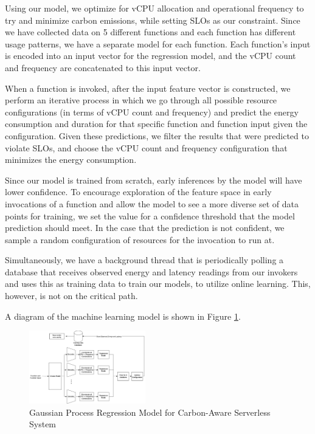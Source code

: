 \documentclass[times, 10pt,twocolumn]{article}
\begin{document}
Using our model, we optimize for vCPU allocation and operational frequency to try and minimize carbon emissions, while setting SLOs as our constraint. Since we have collected data on 5 different functions and each function has different usage patterns, we have a separate model for each function. Each function's input is encoded into an input vector for the regression model, and the vCPU count and frequency are concatenated to this input vector.

When a function is invoked, after the input feature vector is constructed, we perform an iterative process in which we go through all possible resource configurations (in terms of vCPU count and frequency) and predict the energy consumption and duration for that specific function and function input given the configuration. Given these predictions, we filter the results that were predicted to violate SLOs, and choose the vCPU count and frequency configuration that minimizes the energy consumption. 

Since our model is trained from scratch, early inferences by the model will have lower confidence. To encourage exploration of the feature space in early invocations of a function and allow the model to see a more diverse set of data points for training, we set the value for a confidence threshold that the model prediction should meet. In the case that the prediction is not confident, we sample a random configuration of resources for the invocation to run at. 

Simultaneously, we have a background thread that is periodically polling a database that receives observed energy and latency readings from our invokers and uses this as training data to train our models, to utilize online learning. This, however, is not on the critical path.



A diagram of the machine learning model is shown in Figure \ref{fig:ml_model}.

\begin{figure}[ht]
   \centering
   \includegraphics[width=0.45\textwidth]{imgs/ml_model.png}
   \caption{Gaussian Process Regression Model for Carbon-Aware Serverless System}
   \label{fig:ml_model}
 \end{figure}
\end{document}
